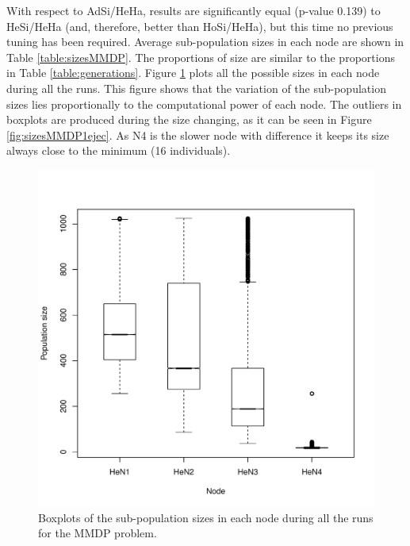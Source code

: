 With respect to AdSi/HeHa, %
results are significantly  equal (p-value 0.139) to HeSi/HeHa (and,
therefore, better than HoSi/HeHa), but this time no previous tuning
has been required.  Average sub-population sizes in each node are
shown in Table \ref{table:sizesMMDP}. The proportions of size are
similar to the proportions in Table \ref{table:generations}. Figure
\ref{fig:sizesMMDP} plots all the possible sizes in each node during
all the runs. This figure shows that the variation of the
sub-population sizes lies proportionally to the computational power of
each node. The outliers in boxplots are produced during the size
changing, as it can be seen in Figure \ref{fig:sizesMMDP1ejec}. As N4
is the slower node with difference it keeps its size always close to
the minimum (16 individuals). %

\begin{figure}
\centering
 \includegraphics[scale =0.4] {gfx/adaptiveresults/sizesMMDP.pdf}
\caption{Boxplots of the sub-population sizes in each node during all
  the runs for the MMDP problem.} 
\label{fig:sizesMMDP}
\end{figure}

